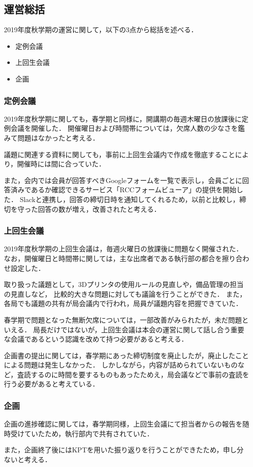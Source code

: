 \subsection*{運営総括}
2019年度秋学期の運営に関して，以下の3点から総括を述べる．
\begin{itemize}
    \item 定例会議
    \item 上回生会議
    \item 企画
\end{itemize}

\subsubsection*{定例会議}
2019年度秋学期に関しても，春学期と同様に，開講期の毎週木曜日の放課後に定例会議を開催した．
開催曜日および時間帯については，欠席人数の少なさを鑑みて問題はなかったと考える．

議題に関連する資料に関しても，事前に上回生会議内で作成を徹底することにより，開催時には間に合っていた．

また，会内では会員が回答すべきGoogleフォームを一覧で表示し，会員ごとに回答済みであるか確認できるサービス「RCCフォームビューア」の提供を開始した．
Slackと連携し，回答の締切日時を通知してくれるため，以前と比較し，締切を守った回答の数が増え，改善されたと考える．

\subsubsection*{上回生会議}
2019年度秋学期の上回生会議は，毎週火曜日の放課後に問題なく開催された．
なお，開催曜日と時間帯に関しては，主な出席者である執行部の都合を擦り合わせ設定した．

取り扱った議題として，3Dプリンタの使用ルールの見直しや，備品管理の担当の見直しなど，
比較的大きな問題に対しても議論を行うことができた．
また，各局でも議題の共有が局会議内で行われ，局員が議題内容を把握できていた．

春学期で問題となった無断欠席については，一部改善がみられたが，未だ問題といえる．
局長だけではないが，上回生会議は本会の運営に関して話し合う重要な会議であるという認識を改めて持つ必要があると考える．

企画書の提出に関しては，春学期にあった締切制度を廃止したが，廃止したことによる問題は発生しなかった．
しかしながら，内容が詰められていないものなど，査読するのに時間を要するものもあったためえ，局会議などで事前の査読を行う必要があると考えている．

\subsubsection*{企画}
企画の進捗確認に関しては，春学期同様，上回生会議にて担当者からの報告を随時受けていたため，執行部内で共有されていた．

また，企画終了後にはKPTを用いた振り返りを行うことができたため，申し分ないと考える．